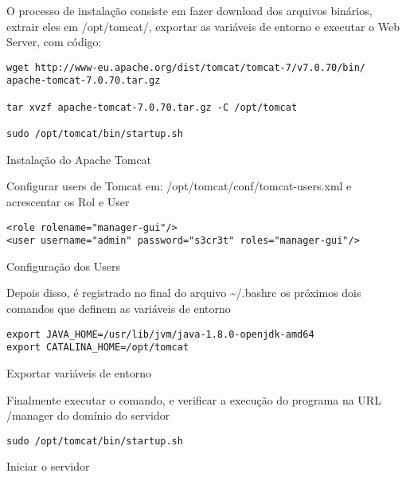 O processo de instalação consiste em fazer download dos arquivos binários,
extrair eles em \foreignlanguage{english}{/opt/tomcat/}, exportar
as variáveis de entorno e executar o \foreignlanguage{english}{Web
Server}, com código:

\begin{algorithm}[h]
\begin{lstlisting}
wget http://www-eu.apache.org/dist/tomcat/tomcat-7/v7.0.70/bin/
apache-tomcat-7.0.70.tar.gz

tar xvzf apache-tomcat-7.0.70.tar.gz -C /opt/tomcat

sudo /opt/tomcat/bin/startup.sh
\end{lstlisting}
\caption{Instalação do \foreignlanguage{english}{Apache Tomcat}}
\end{algorithm}

Configurar \foreignlanguage{english}{users} de \foreignlanguage{english}{Tomcat}
em: \foreignlanguage{english}{/opt/tomcat/conf/tomcat-users.xml }e
acrescentar os Rol e \foreignlanguage{english}{User}

\begin{algorithm}[h]
\begin{lstlisting}
<role rolename="manager-gui"/> 
<user username="admin" password="s3cr3t" roles="manager-gui"/>
\end{lstlisting}
\caption{Configuração dos Users}
\end{algorithm}

Depois disso, é registrado no final do arquivo \textasciitilde{}/.bashrc
os próximos dois comandos que definem as variáveis de entorno

\begin{algorithm}[h]
\begin{lstlisting}
export JAVA_HOME=/usr/lib/jvm/java-1.8.0-openjdk-amd64 
export CATALINA_HOME=/opt/tomcat
\end{lstlisting}
\caption{Exportar variáveis de entorno}
\end{algorithm}

Finalmente executar o comando, e verificar a execução do programa
na URL /manager do domínio do servidor

\begin{algorithm}[h]
\begin{lstlisting}
sudo /opt/tomcat/bin/startup.sh
\end{lstlisting}
\caption{Iniciar o servidor}
\end{algorithm}


